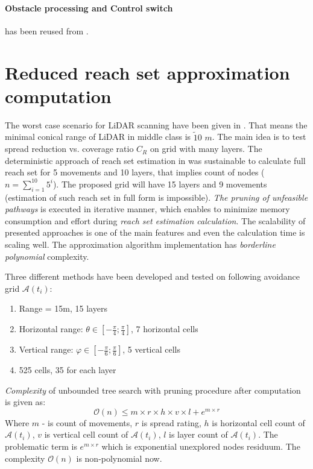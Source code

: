 \paragraph{Obstacle processing and Control switch} has been reused from \cite{alojzgomola2017}.

\section{Reduced reach set approximation computation}
\noindent The worst case scenario for LiDAR scanning have been given in \cite{sabatini2014lidar}. That means the minimal conical range of LiDAR in middle class is $\tilde10$ $m$. The main idea is to test spread reduction vs. coverage ratio $C_R$ on grid with many layers. The deterministic approach of reach set estimation in \cite{alojzgomola2017} was sustainable to calculate full reach set for 5 movements and 10 layers, that implies count of nodes ($n=\sum_{i=1}^10 5^i$). The proposed grid will have 15 layers and 9 movements (estimation of such reach set in full form is impossible). \emph{The pruning of unfeasible pathways} is executed in iterative manner, which enables to minimize memory consumption and effort during \emph{reach set estimation calculation}. The scalability of presented approaches is one of the main features and even the calculation time is scaling well. The approximation algorithm implementation has \emph{borderline polynomial} complexity.


Three different methods have been developed and tested on following avoidance grid $\mathscr{A}(t_i)$:
\begin{enumerate}
    \item Range = 15m, 15 layers
    \item Horizontal range: $\theta\in[-\frac{\pi}{4};\frac{\pi}{4}]$, 7 horizontal cells
    \item Vertical range: $\varphi\in[-\frac{\pi}{6};\frac{\pi}{6}]$, 5 vertical cells
    \item 525 cells, 35 for each layer
\end{enumerate}

\emph{Complexity} of unbounded tree search with pruning procedure after computation is given as:
\begin{equation}
    \mathscr{O}(n) \le m \times r\times h\times v\times l + e^{m \times r} 
\end{equation}
Where $m$ - is count of movements, $r$ is spread rating, $h$ is horizontal cell count of $\mathscr{A}(t_i)$, $v$ is vertical cell count of $\mathscr{A}(t_i)$, $l$ is layer count of $\mathscr{A}(t_i)$. The problematic term is $e^{m \times r}$ which is exponential unexplored nodes residuum. The complexity $\mathscr{O}(n)$ is non-polynomial now. 

